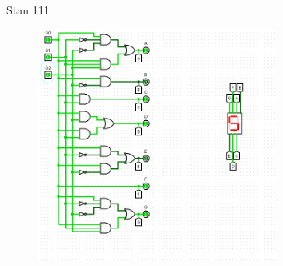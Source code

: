 \documentclass[]{article}
\begin{document}
\newpage
Stan 111
\begin{figure}[H]
	\centering
	\includegraphics[width=0.7\textwidth]{JEDEN_111.png}
\end{figure}
\end{document}
